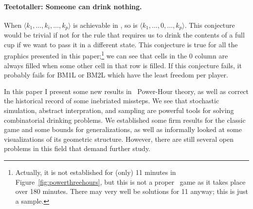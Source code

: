\documentclass[twocolumn]{article}
\begin{document}
\paragraph{Teetotaller: Someone can drink nothing.} When $\langle k_1, 
\ldots, k_i, \ldots, k_p \rangle$ is achievable in \bmsl, so is
$\langle k_1, \ldots, 0, \ldots, k_p \rangle$. This conjecture would
be trivial if not for the rule that requires us to drink the contents
of a full cup if we want to pass it in a different state. This
conjecture is true for all the graphics presented in this
paper;\footnote{Actually, it is not established for (only) 11 minutes
  in Figure~\ref{fig:powerthreehours}, but this is not a proper
  \bmsl\ game as it takes place over 180 minutes. There may very well
  be solutions for 11 anyway; this is just a sample.} we can see that
cells in the 0 column are always filled when some other cell in that
row is filled. If this conjecture fails, it probably fails for BM1L or
BM2L which have the least freedom per player.

\medskip

In this paper I present some new results in \kn\ Power-Hour theory, as
well as correct the historical record of some inebriated missteps. We
see that stochastic simulation, abstract interpration, and sampling
are powerful tools for solving combinatorial drinking problems. We
established some firm results for the classic game and some bounds for
generalizations, as well as informally looked at some visualizations
of its geometric structure. However, there are still several open
problems in this field that demand further study.

{}

\end{document}
